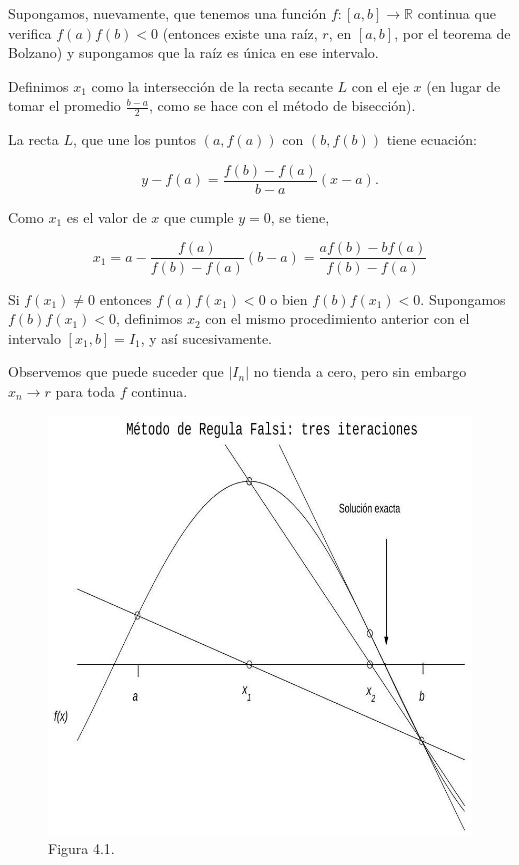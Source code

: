 \documentclass[10pt]{article}
\begin{document}
Supongamos, nuevamente, que tenemos una función $f:[a, b] \rightarrow \mathbb{R}$ continua que verifica $f(a) f(b)<0$ (entonces existe una raíz, $r$, en $[a, b]$, por el teorema de Bolzano) y supongamos que la raíz es única en ese intervalo.

Definimos $x_{1}$ como la intersección de la recta secante $L$ con el eje $x$ (en lugar de tomar el promedio $\frac{b-a}{2}$, como se hace con el método de bisección).

La recta $L$, que une los puntos $(a, f(a))$ con $(b, f(b))$ tiene ecuación:

$$
y-f(a)=\frac{f(b)-f(a)}{b-a}(x-a) .
$$

Como $x_{1}$ es el valor de $x$ que cumple $y=0$, se tiene,

$$
x_{1}=a-\frac{f(a)}{f(b)-f(a)}(b-a)=\frac{a f(b)-b f(a)}{f(b)-f(a)}
$$

Si $f\left(x_{1}\right) \neq 0$ entonces $f(a) f\left(x_{1}\right)<0$ o bien $f(b) f\left(x_{1}\right)<0$. Supongamos $f(b) f\left(x_{1}\right)<0$, definimos $x_{2}$ con el mismo procedimiento anterior con el intervalo $\left[x_{1}, b\right]=I_{1}$, y así sucesivamente.

Observemos que puede suceder que $\left|I_{n}\right|$ no tienda a cero, pero sin embargo $x_{n} \rightarrow r$ para toda $f$ continua.

\begin{figure}[h]
\begin{center}
  \includegraphics[width=\textwidth]{2025_09_05_3888c9ac96bd653d96b4g-073}
\captionsetup{labelformat=empty}
\caption{Figura 4.1.}
\end{center}
\end{figure}
\end{document}
